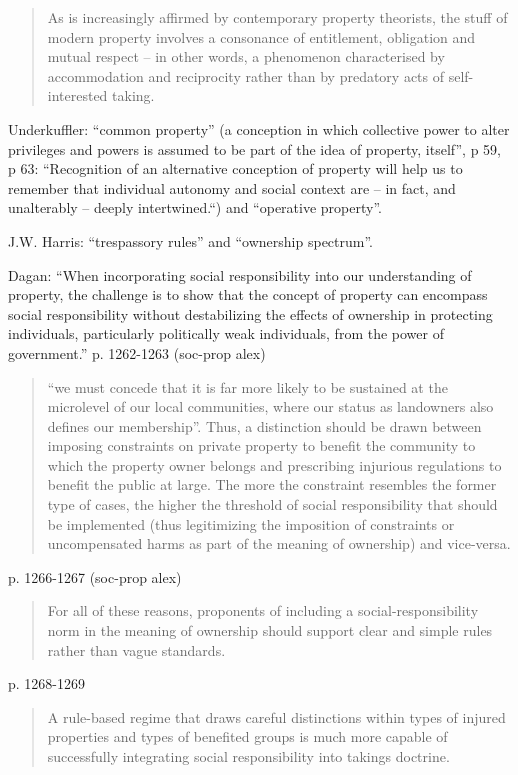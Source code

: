 \begin{quote}
As is increasingly affirmed by contemporary property theorists, the stuff of modern property involves a consonance of entitlement, obligation and mutual respect -- in other words, a phenomenon characterised by accommodation and reciprocity rather than by predatory acts of self-interested taking.
\end{quote}

Underkuffler: ``common property'' (a conception in which collective power to alter privileges and powers is assumed to be part of the idea of property, itself'', p 59, p 63:  ``Recognition of an alternative conception of property will help us to remember that individual autonomy and social context are -- in fact, and unalterably -- deeply intertwined.``)  and ``operative property''. 

J.W. Harris:  ``trespassory rules'' and ``ownership spectrum''.

Dagan: ``When incorporating social responsibility into our understanding
of property, the challenge is to show that the concept of property can
encompass social responsibility without destabilizing the effects
of ownership in protecting individuals, particularly politically
weak individuals, from the power of government.'' p. 1262-1263 (soc-prop alex)

\begin{quote}``we must concede that it is far more likely to be sustained at the microlevel of our local communities, where our status as landowners also defines our membership''. Thus, a distinction should be drawn between imposing constraints on private property to benefit the community to which the property owner belongs and prescribing injurious regulations to benefit the public at large. The more the constraint resembles the former type of cases, the higher the threshold of social responsibility that should be implemented (thus legitimizing the imposition of constraints  or uncompensated harms as part of the meaning of ownership) and vice-versa.
\end{quote}p. 1266-1267 (soc-prop alex)

\begin{quote}
For all of these reasons, proponents of including a social-responsibility norm in the meaning
of ownership should support clear and simple rules rather than vague standards.
\end{quote}p. 1268-1269

\begin{quote}
A rule-based regime that draws careful distinctions within types of injured properties and types
of benefited groups is much more capable of successfully integrating
social responsibility into takings doctrine.
\end{quote}

